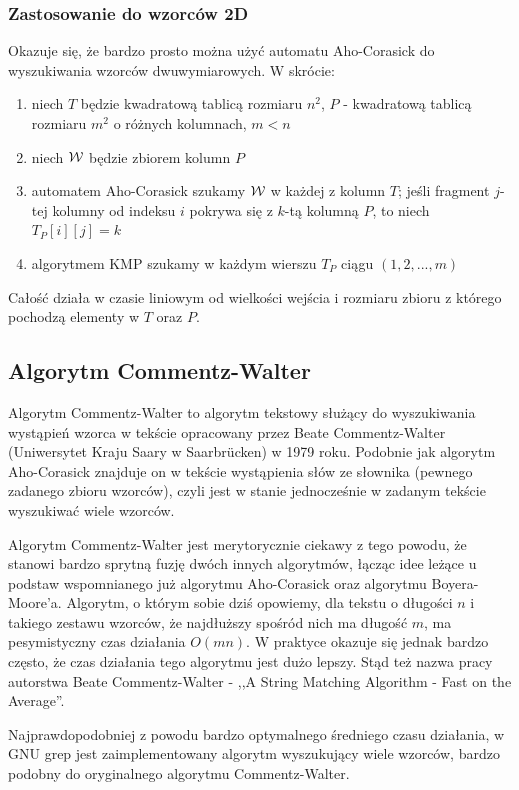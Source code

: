 \subsubsection{Zastosowanie do wzorców 2D}
Okazuje się, że bardzo prosto można użyć automatu Aho-Corasick do wyszukiwania wzorców dwuwymiarowych. W skrócie:
\begin{enumerate}
    \item niech $T$ będzie kwadratową tablicą rozmiaru $n^2$, $P$ - kwadratową tablicą rozmiaru $m^2$ o różnych kolumnach, $m < n$
    \item niech $\operatorname{\mathcal{W}}$ będzie zbiorem kolumn $P$
    \item automatem Aho-Corasick szukamy $\operatorname{\mathcal{W}}$ w każdej z kolumn $T$; jeśli fragment $j$-tej kolumny od indeksu $i$ pokrywa się z $k$-tą kolumną $P$, to niech $T_P[i][j]=k$
    \item algorytmem KMP szukamy w każdym wierszu $T_P$ ciągu $(1,2,...,m)$
\end{enumerate}
Całość działa w czasie liniowym od wielkości wejścia i rozmiaru zbioru z którego pochodzą elementy w $T$ oraz $P$.


\subsection{Algorytm Commentz-Walter}
Algorytm Commentz-Walter to algorytm tekstowy służący do wyszukiwania wystąpień wzorca w tekście opracowany przez Beate Commentz-Walter (Uniwersytet Kraju Saary w Saarbrücken) w 1979 roku. Podobnie jak algorytm Aho-Corasick znajduje on w tekście wystąpienia słów ze słownika (pewnego zadanego zbioru wzorców), czyli jest w stanie jednocześnie w zadanym tekście wyszukiwać wiele wzorców. 

Algorytm Commentz-Walter jest merytorycznie ciekawy z tego powodu, że stanowi bardzo sprytną fuzję dwóch innych algorytmów, łącząc idee leżące u podstaw wspomnianego już algorytmu Aho-Corasick oraz algorytmu Boyera-Moore'a. Algorytm, o którym sobie dziś opowiemy, dla tekstu o długości $n$ i takiego zestawu wzorców, że najdłuższy spośród nich ma długość $m$, ma pesymistyczny czas działania $O(mn)$. W praktyce okazuje się jednak bardzo często, że czas działania tego algorytmu jest dużo lepszy. Stąd też nazwa pracy autorstwa Beate Commentz-Walter - ,,A String Matching Algorithm - Fast on the Average''. 

Najprawdopodobniej z powodu bardzo optymalnego średniego czasu działania, w GNU grep jest zaimplementowany algorytm wyszukujący wiele wzorców, bardzo podobny do oryginalnego algorytmu Commentz-Walter.

